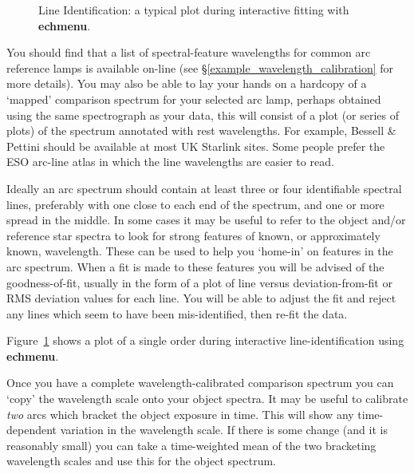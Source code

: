 \documentclass[twoside,11pt]{article}
\newcommand{\htmlref}[2]{#1}
\newcommand{\xref}[3]{#1}
\newcommand{\xlabel}[1]{}
\newcommand{\mlabel}[1]{\xlabel{#1}\label{#1}}
\newcommand{\scspec}[2]{#1}
\newcommand{\scspec}[2]{#2}
\begin{document}
\begin{figure}
\begin{center}
  \scspec{\leavevmode\epsfysize=105mm\epsfbox{sc7_08.eps}}
         {\leavevmode\epsfysize=136mm}

  \parbox{140mm}{
    \caption{Line Identification: a typical plot during interactive
             fitting with \xref{{\bf echmenu}}{sun152}{}.}
    \label{fi_echarc_plot}
  }
\end{center}
\end{figure}

\mlabel{atlases}
You should find that a list of spectral-feature wavelengths for
common arc reference lamps is available on-line (see
\scspec{\S\ref{example_wavelength_calibration}}{the \xref{worked
example}{example_wavelength_calibration}} for more details).
You may also be able to lay your hands on a hardcopy of a `mapped'
\htmlref{comparison spectrum}{gl_comparison} for your selected
\htmlref{arc lamp}{gl_arc},  perhaps obtained using
the same spectrograph as your data, this will consist of a plot
(or series of plots) of the spectrum annotated with rest wavelengths.
For example, Bessell \& Pettini\cite{echref} should be available
at most UK Starlink sites.
Some people prefer the \htmlref{ESO}{gl_eso} arc-line atlas\cite{eso_main}
in which the line wavelengths are easier to read.

Ideally an arc spectrum should contain at least three or four
identifiable spectral lines, preferably with one close to each
end of the spectrum, and one or more spread in the middle.
In some cases it may be useful to refer to the object and/or reference star
spectra to look for strong features of known, or approximately known,
wavelength.
These can be used to help you `home-in' on features in the arc spectrum.
When a fit is made to these features you will be advised of the
goodness-of-fit, usually in the form of a plot of line versus
deviation-from-fit or RMS deviation values for each line.
You will be able to adjust the fit and reject any lines which
seem to have been mis-identified, then re-fit the data.

\scspec{Figure~\ref{fi_echarc_plot}}{The figure above} shows a plot of a
single order during interactive line-identification using
\xref{{\bf echmenu}}{sun152}{}.

Once you have a complete wavelength-calibrated comparison spectrum you
can `copy' the wavelength scale onto your object spectra.
It may be useful to calibrate {\em two} arcs which
\htmlref{bracket}{gl_bracketing} the object exposure in time.
This will show any time-dependent variation in the wavelength scale.
If there is some change (and it is reasonably small) you can
take a time-weighted mean of the two bracketing wavelength scales and use
this for the object spectrum.
\end{document}
